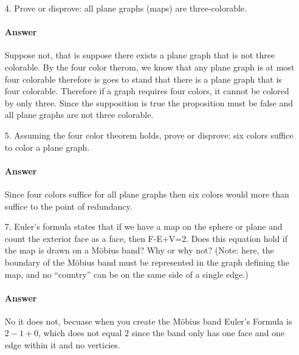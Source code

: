 \documentclass{article}
\begin{document}
\begin{enumerate}
    \item[4.] Prove or disprove: all plane graphs (maps) are three-colorable.

        \paragraph{Answer}
        Suppose not, that is suppose there exists a plane graph that is not three colorable. By the four color therom, we know that any plane graph is at most four colorable therefore is goes to stand that there is a plane graph that is four colorable. Therefore if a graph requires four colors, it cannot be colored by only three. Since the supposition is true the proposition must be false and all plane graphs are not three colorable.

    \item[5.] Assuming the four color theorem holds, prove or disprove: six colors
        suffice to color a plane graph.

        \paragraph{Answer}
        Since four colors suffice for all plane graphs then six colors would more than suffice to the
point of redundancy.


    \item[7.] Euler's formula states that if we have a map on the sphere or plane
        and count the exterior face as a face, then F-E+V=2.  Does this equation
        hold if the map is drawn on a M\"obius band? Why or why not? (Note:
        here, the boundary of the M\"obius band must be represented in the graph
        defining the map, and no ``country'' can be on the same side of a single
        edge.)

        \paragraph{Answer}
       No it does not, becuase when you create the M\"obius band Euler's Formula is $2-1+0$, which does not equal $2$ since the band only has one face and one edge within it and no verticies.


\end{enumerate}




 
\end{document}

